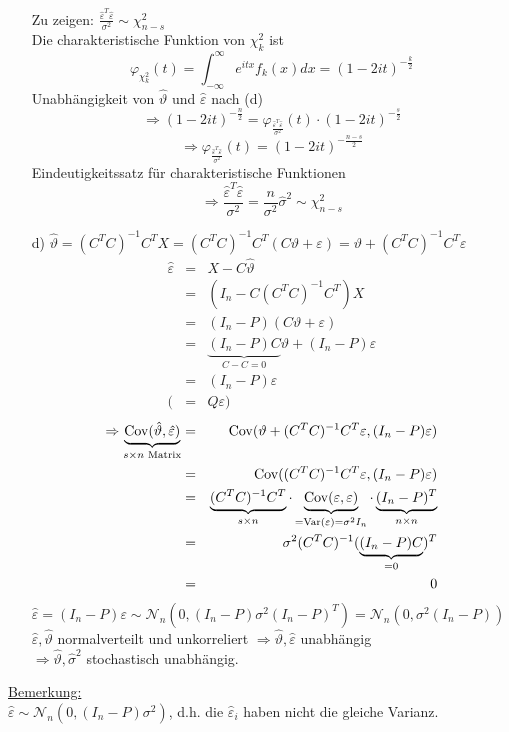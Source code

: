 \documentclass[a4paper,11pt,twoside,titlepage]{article}
\newcommand\NN{ \mathcal{N} } %
\DeclareMathOperator{\var}{Var}
\DeclareMathOperator{\cov}{Cov}
\begin{document}
\begin{itemize}
Zu zeigen: $\frac{\hat\varepsilon^T\hat\varepsilon}{\sigma^2}\sim\chi^2_{n-s}$\\
Die charakteristische Funktion von $\chi_k^2$ ist $$\varphi_{\chi_k^2}(t)=
 \int_{-\infty}^\infty e^{itx}f_k(x)dx=(1-2it)^{-\frac{k}{2}}$$
Unabhängigkeit von $\hat\vartheta$ und $\hat\varepsilon$ nach (d)
\[\Rightarrow (1-2it)^{-\frac{n}{2}}=\varphi_{\frac{\hat\varepsilon^T\hat\varepsilon}{\sigma^2}}(t)\cdot(1-2it)^{-\frac{s}{2}}\]
\[\Rightarrow\varphi_{\frac{\hat\varepsilon^T\hat\varepsilon}{\sigma^2}}(t)=(1-2it)^{-\frac{n-s}{2}}\]
 Eindeutigkeitssatz für charakteristische Funktionen
 $$\Rightarrow\frac{\hat\varepsilon^T\hat\varepsilon}{\sigma^2}=\frac{n}{\sigma^2}\hat\sigma^2\sim\chi_{n-s}^2$$
\item[d) ]$\hat\vartheta=(C^TC)^{-1}C^TX=(C^TC)^{-1}C^T(C\vartheta+\varepsilon)
=\vartheta+(C^TC)^{-1}C^T\varepsilon$
\begin{eqnarray*}
\hat\varepsilon&=&X-C\hat\vartheta\\
&=&(I_n-C(C^TC)^{-1}C^T)X\\
&=&(I_n-P)(C\vartheta+\varepsilon)\\
&=&\underbrace{(I_n-P)C}_{C-C=0}\vartheta+(I_n-P)\varepsilon\\
&=&(I_n-P)\varepsilon\\(&=&Q\varepsilon)
\end{eqnarray*}
\begin{eqnarray*}
\Rightarrow\underbrace{\cov(\hat\vartheta,\hat\varepsilon)}_{s\times n \textnormal{ Matrix}}&=&\cov(\vartheta+(C^TC)^{-1}C^T\varepsilon,(I_n-P)\varepsilon)\\
&=&\cov((C^TC)^{-1}C^T\varepsilon,(I_n-P)\varepsilon)\\
&=&\underbrace{(C^TC)^{-1}C^T}_{s\times n}\cdot \underbrace{\cov(\varepsilon,\varepsilon)}_{=\var(\varepsilon)=\sigma^2I_n}\cdot\underbrace{(I_n-P)^T}_{n\times n}\\
&=&\sigma^2(C^TC)^{-1}(\underbrace{(I_n-P)C}_{=0})^T\\&=&0
\end{eqnarray*}
$\hat\varepsilon=(I_n-P)\varepsilon\sim\NN_n(0,(I_n-P)\sigma^2(I_n-P)^T)=\NN_n(0,\sigma^2(I_n-P))$\\
$\hat\varepsilon,\hat\vartheta$ normalverteilt und unkorreliert $\Rightarrow \hat\vartheta,\hat\varepsilon$ unabhängig\\ $\Rightarrow\hat\vartheta,\hat\sigma^2$ stochastisch unabhängig.
\end{itemize}
 
 \underline{Bemerkung:}\\
 $\hat\varepsilon\sim\NN_n(0,(I_n-P)\sigma^2)$, d.h. die $\hat\varepsilon_i$ haben nicht die gleiche Varianz.
\end{document}
